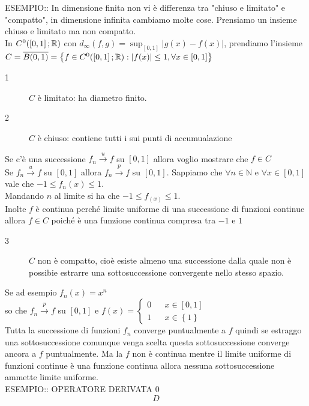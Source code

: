 ESEMPIO:: In dimensione finita non vi è differenza tra "chiuso e limitato" e "compatto", in dimensione infinita cambiamo molte cose.
Prensiamo un insieme chiuso e limitato ma non compatto.\\
In $C^0(\left[0,1\right]; \mathbb{R})$ con $d_\infty(f,g)=\sup_{\left[0,1\right]}\left|g(x)-f(x)\right|$, prendiamo l'insieme $C=\overline{B(0,1)}=\left\{f\in C^0(\left[0,1\right]; \mathbb{R}):\left|f(x)\right|\le 1, \forall x \in\left[0,1\right]\right\}$
\begin{description}
	\item[1] $C$ è limitato: ha diametro finito.
	\item[2] $C$ è chiuso: contiene tutti i sui punti di accumualazione
\end{description}
Se c'è una successione $f_n\overset{u}{\to}f$ su $\left[0,1\right]$ allora voglio mostrare che $f\in C$\\
Se $f_n\overset{u}{\to}f$ su $\left[0,1\right]$ allora $f_n\overset{p}{\to}f$ su $\left[0,1\right]$.
Sappiamo che $\forall n\in\mathbb{N}$ e $\forall x\in \left[0,1\right]$ vale che $-1\le f_n(x)\le 1$.\\
Mandando $n$ al limite si ha che $-1\le f_(x)\le 1$.\\
Inolte $f$ è continua perché limite uniforme di una successione di funzioni continue allora $f\in C$ poiché è una funzione continua compresa tra $-1$ e $1$
\begin{description}
	\item[3] $C$ non è compatto, cioè esiste almeno una successione dalla quale non è possibie estrarre una sottosuccessione convergente nello stesso spazio.
\end{description}
Se ad esempio $f_n(x) = x^n$\\
so che $f_n\overset{p}{\to}f$ su $\left[0,1\right]$ e $f(x)=\left\{\begin{matrix}0&&x\in\left[0,1\right]\\1&&x\in\left\{1\right\}\end{matrix}\right.$\\
Tutta la successione di funzioni $f_n$ converge puntualmente a $f$ quindi se estraggo una sottosuccessione comunque venga scelta questa sottosuccessione converge ancora a $f$ puntualmente. Ma la $f$ non è continua mentre il limite uniforme di funzioni continue è una funzione continua allora nessuna sottosuccessione ammette limite uniforme.\\

ESEMPIO:: OPERATORE DERIVATA 0\\
$$D$$

